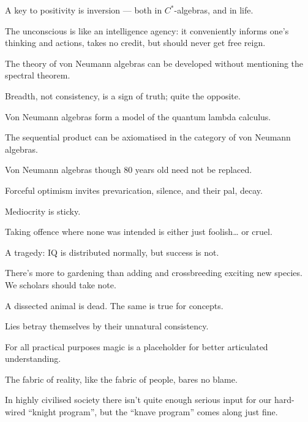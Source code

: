 \begin{parsec}%
A key to positivity is inversion --- both in  $C^*$-algebras,
and in life.
\end{parsec}
\begin{parsec}
The unconscious is like an intelligence agency:
it conveniently informs one's thinking and actions,
takes no credit,
but should never get free reign.
\end{parsec}
\begin{parsec}%
The theory of von Neumann algebras
can be developed without mentioning
the spectral theorem.
\end{parsec}
\begin{parsec}%
Breadth, not consistency, is a sign of truth;
quite the opposite.
\end{parsec}
\begin{parsec}
Von Neumann algebras form a model of the quantum lambda calculus.
\end{parsec}
\begin{parsec}
The sequential product can be axiomatised in the category of von Neumann
algebras.
\end{parsec}
\begin{parsec}%
Von Neumann algebras
though 80 years old
need not be replaced.
\end{parsec}
\begin{parsec}%
Forceful optimism
invites prevarication, silence,
and their pal, decay.
\end{parsec}
\begin{parsec}%
Mediocrity is sticky.
\end{parsec}
\begin{parsec}%
Taking offence where none was intended
is either just foolish\dots{} or cruel.
\end{parsec}
\begin{parsec}%
A tragedy:
IQ is distributed normally,
but success is not.
\end{parsec}
\begin{parsec}%
There's more to gardening
than adding and crossbreeding exciting new species.
We scholars should take note.
\end{parsec}
\begin{parsec}%
A dissected animal is dead.
The same is true for concepts.
\end{parsec}
\begin{parsec}%
Lies betray themselves by their
unnatural consistency.
\end{parsec}
\begin{parsec}%
For all practical purposes
magic is a placeholder for better
articulated understanding.
\end{parsec}
\begin{parsec}%
The fabric
of reality,
like the fabric of people,
bares no blame.
\end{parsec}
\begin{parsec}%
In highly civilised society
there isn't quite enough serious input
for our hard-wired ``knight program'',
but the ``knave program'' comes along just fine.
\end{parsec}
